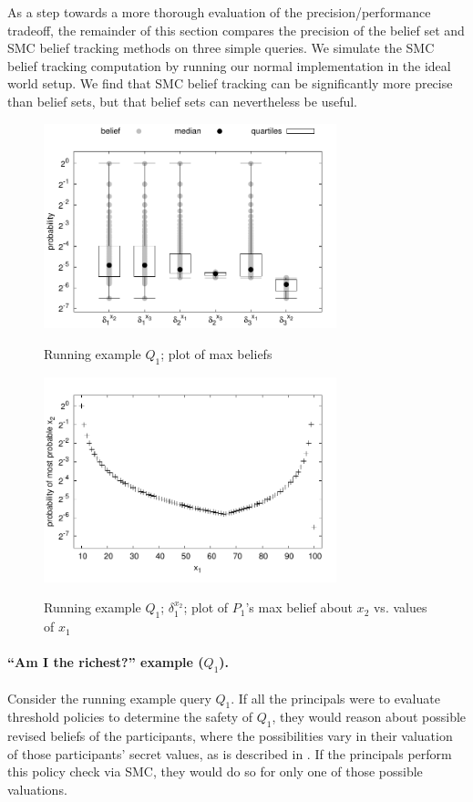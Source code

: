 \documentclass[10pt]{sigplanconf}
\begin{document}
As a step towards a more thorough evaluation of the
precision/performance tradeoff, the remainder of this section compares
the precision of the belief set and SMC belief tracking methods on
three simple queries.  We simulate the SMC belief tracking computation
by running our normal implementation in the ideal world setup.  We
find that SMC belief tracking can be significantly more precise than
belief sets, but that belief sets can nevertheless be useful.

\begin{figure}[t]
\scriptsize
\centering
\includegraphics[width=8.5cm]{figures/beliefs_run_example.pdf} \\
\caption{Running example $Q_1$; plot of max beliefs}
\label{fig:run-example}
\end{figure}

\begin{figure}[t]
\scriptsize
\centering
\includegraphics[width=8.5cm]{figures/beliefs_run_col1.pdf} \\
\caption{Running example $Q_1$; $ \delta_1^{x_2} $; plot of $ P_1 $'s
max belief about $ x_2 $ vs. values of $ x_1 $}
\label{fig:run-example-col1}
\end{figure}

\paragraph*{``Am I the richest?'' example ($Q_1$).}
Consider the running example query $ Q_1 $. If all the principals were
to evaluate threshold policies to determine the safety of $ Q_1 $,
they would reason about possible revised beliefs of the participants,
where the possibilities vary in their valuation of those participants'
secret values, as is described in . If the
principals perform this policy check via SMC, they would do so for
only one of those possible valuations.
\end{document}
